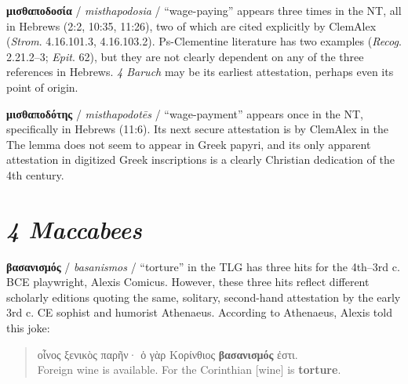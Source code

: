  \noindent{}\textbf{μισθαποδοσία} / \textit{misthapodosia} / “wage-paying” appears three times in the NT, %
 all in Hebrews (2:2, 10:35, 11:26), %
 two of which are cited explicitly by ClemAlex (\textit{Strom}. 4.16.101.3, 4.16.103.2). %
 Ps-Clementine literature has two examples (\textit{Recog}. 2.21.2--3; \textit{Epit}. 62), %
 but they are not clearly dependent on any of the three references in Hebrews. %
 \textit{4 Baruch} may be its earliest attestation, %
perhaps even its point of origin. %

\vspace*{3mm}
\noindent{}\textbf{μισθαποδότης} / \textit{misthapodotēs} / “wage-payment” appears once in the NT, %
specifically in Hebrews (11:6). Its next secure attestation is by ClemAlex in the %
 The lemma does not seem to appear %
in Greek papyri, and its only apparent attestation %
in digitized Greek inscriptions is a clearly Christian dedication %
of the 4th century. \\[1mm] %

\section{\textit{4 Maccabees}}

\noindent{}\textbf{βασανισμός} / \textit{basanismos} / “torture” in the TLG has %
three hits for the 4th--3rd c. BCE playwright, Alexis Comicus. %
However, these three hits reflect different scholarly editions quoting the same, %
solitary, second-hand attestation by the early 3rd c. CE sophist and humorist Athenaeus.
According to Athenaeus, Alexis told this joke: %

\vspace*{3mm} 
 \begin{quote}οἶνος ξενικὸς παρῆν· ὁ γὰρ Κορίνθιος \textbf{βασανισμός} ἐστι. \\[1mm] %
 Foreign wine is available. For the Corinthian [wine] is \textbf{torture}.\end{quote} %
 \vspace*{3mm}

